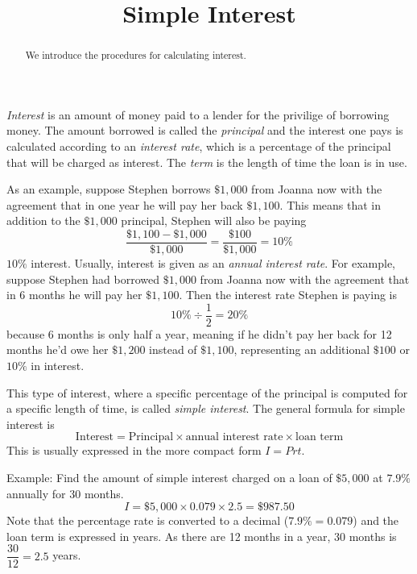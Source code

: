 \documentclass{ximera}
\title{Simple Interest}
\begin{document}
\begin{abstract}
We introduce the procedures for calculating interest.
\end{abstract}
\maketitle


\emph{Interest} is an amount of money paid to a lender for the privilige of borrowing money. The amount borrowed is called the \emph{principal} and the interest one pays is calculated according to an \emph{interest rate}, which is a percentage of the principal that will be charged as interest. The \emph{term} is the length of time the loan is in use.

As an example, suppose Stephen borrows $\$1,000$ from Joanna now with the agreement that in one year he will pay her back $\$1,100$. This means that in addition to the $\$1,000$ principal, Stephen will also be paying
$$
\frac{\$1,100-\$1,000}{\$1,000}=\frac{\$100}{\$1,000}=10\%
$$
$10\%$ interest. Usually, interest is given as an \emph{annual interest rate}. For example, suppose Stephen had borrowed $\$1,000$ from Joanna now with the agreement that in $6$ months he will pay her $\$1,100$. Then the interest rate Stephen is paying is
$$
10\%\div \frac{1}{2}=20\%
$$
because 6 months is only half a year, meaning if he didn't pay her back for 12 months he'd owe her $\$1,200$ instead of $\$1,100$, representing an additional $\$100$ or $10\%$ in interest.

This type of interest, where a specific percentage of the principal is computed for a specific length of time, is called \emph{simple interest}. The general formula for simple interest is
\begin{equation}\label{simpleinterest}
\text{Interest}=\text{Principal}\times\text{annual interest rate}\times\text{loan term}
\end{equation}
This is usually expressed in the more compact form $I=Prt$.

Example: Find the amount of simple interest charged on a loan of $\$5,000$ at $7.9\%$ annually for 30 months.
$$
I=\$5,000\times 0.079\times 2.5=\$987.50
$$
Note that the percentage rate is converted to a decimal ($7.9\%=0.079$) and the loan term is expressed in years. As there are 12 months in a year, 30 months is $\dfrac{30}{12}=2.5$ years.
\end{document}
